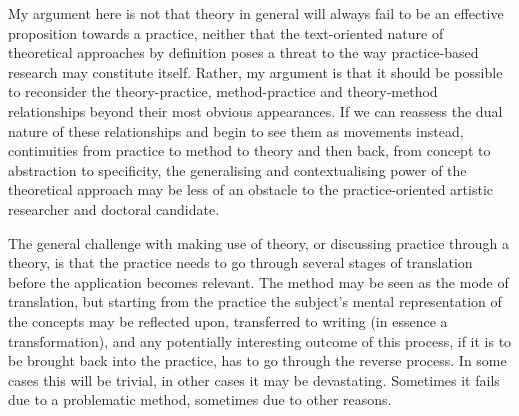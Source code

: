 \documentclass[12pt]{article}
\begin{document}

My argument here is not that theory in general will always fail to be an effective proposition towards a practice, neither that the text-oriented nature of theoretical approaches by definition poses a threat to the way practice-based research may constitute itself. Rather, my argument is that it should be possible to reconsider the theory-practice, method-practice and theory-method relationships beyond their most obvious appearances. If we can reassess the dual nature of these relationships and begin to see them as movements instead, continuities from practice to method to theory and then back, from concept to abstraction to specificity, the generalising and contextualising power of the theoretical approach may be less of an obstacle to the practice-oriented artistic researcher and doctoral candidate.


The general challenge with making use of theory, or discussing practice through a theory, is that the practice needs to go through several stages of translation before the application becomes relevant. The method may be seen as the mode of translation, but starting from the practice the subject's mental representation of the concepts may be reflected upon, transferred to writing (in essence a  transformation), and any potentially interesting outcome of this process, if it is to be brought back into the practice, has to go through the reverse process. In some cases this will be trivial, in other cases it may be devastating. Sometimes it fails due to a problematic method, sometimes due to other reasons.
\end{document}
